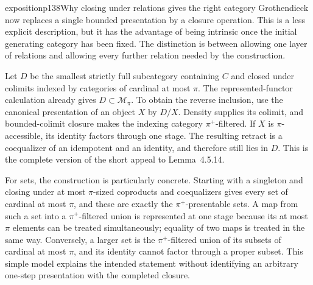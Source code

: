 \begin{dcomment}{exposition}{p138}{Why closing under relations gives the right category}
Grothendieck now replaces a single bounded presentation by a closure operation. This is a less explicit description, but it has the advantage of being intrinsic once the initial generating category has been fixed. The distinction is between allowing one layer of relations and allowing every further relation needed by the construction.

Let $D$ be the smallest strictly full subcategory containing $C$ and closed under colimits indexed by categories of cardinal at most $\pi$. The represented-functor calculation already gives $D\subset\mathcal M_\pi$. To obtain the reverse inclusion, use the canonical presentation of an object $X$ by $D/X$. Density supplies its colimit, and bounded-colimit closure makes the indexing category $\pi^+$-filtered. If $X$ is $\pi$-accessible, its identity factors through one stage. The resulting retract is a coequalizer of an idempotent and an identity, and therefore still lies in $D$. This is the complete version of the short appeal to Lemma~4.5.14.

For sets, the construction is particularly concrete. Starting with a singleton and closing under at most $\pi$-sized coproducts and coequalizers gives every set of cardinal at most $\pi$, and these are exactly the $\pi^+$-presentable sets. A map from such a set into a $\pi^+$-filtered union is represented at one stage because its at most $\pi$ elements can be treated simultaneously; equality of two maps is treated in the same way. Conversely, a larger set is the $\pi^+$-filtered union of its subsets of cardinal at most $\pi$, and its identity cannot factor through a proper subset. This simple model explains the intended statement without identifying an arbitrary one-step presentation with the completed closure.
\end{dcomment}

